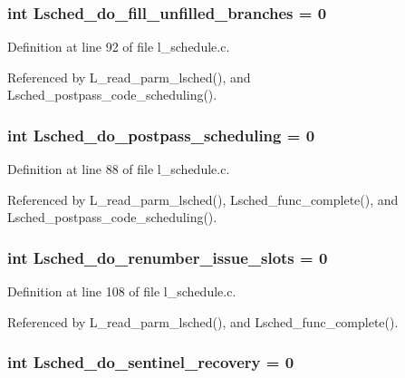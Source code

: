 \subsubsection{\setlength{\rightskip}{0pt plus 5cm}int \bf{Lsched\_\-do\_\-fill\_\-unfilled\_\-branches} = 0}\label{l__schedule_8c_51b02dd4ff5d452f0832853d61065c2c}




Definition at line 92 of file l\_\-schedule.c.

Referenced by L\_\-read\_\-parm\_\-lsched(), and Lsched\_\-postpass\_\-code\_\-scheduling().
\subsubsection{\setlength{\rightskip}{0pt plus 5cm}int \bf{Lsched\_\-do\_\-postpass\_\-scheduling} = 0}\label{l__schedule_8c_0feea7b69688d91321677afa857b2e9b}




Definition at line 88 of file l\_\-schedule.c.

Referenced by L\_\-read\_\-parm\_\-lsched(), Lsched\_\-func\_\-complete(), and Lsched\_\-postpass\_\-code\_\-scheduling().
\subsubsection{\setlength{\rightskip}{0pt plus 5cm}int \bf{Lsched\_\-do\_\-renumber\_\-issue\_\-slots} = 0}\label{l__schedule_8c_a4b5460a6770efd4d849eb261e856daa}




Definition at line 108 of file l\_\-schedule.c.

Referenced by L\_\-read\_\-parm\_\-lsched(), and Lsched\_\-func\_\-complete().
\subsubsection{\setlength{\rightskip}{0pt plus 5cm}int \bf{Lsched\_\-do\_\-sentinel\_\-recovery} = 0}\label{l__schedule_8c_e92a2b503333948c586d0b6907833c94}




